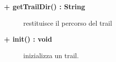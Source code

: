 \begin{description}
	\begin{description}
		\item[\textbf{\color{blue}+ getTrailDir() : String			}] \hfill
			restituisce il percorso del trail

	\end{description}
	
	\begin{description}
		\item[\textbf{\color{blue}+ init() : void			}] \hfill
			inizializza un trail.
		
	\end{description}
		
\end{description}
